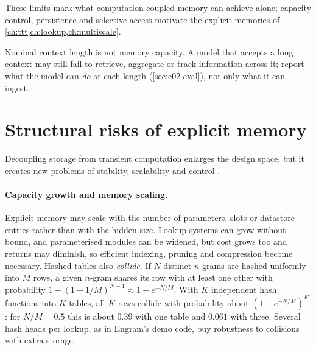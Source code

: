 These limits mark what computation-coupled memory can achieve alone; capacity control, persistence
and selective access motivate the explicit memories of \cref{ch:ttt,ch:lookup,ch:multiscale}.

\begin{pitfall}
Nominal context length is not memory capacity. A model that accepts a long context may still fail
to retrieve, aggregate or track information across it; report what the model can \emph{do} at each
length (\cref{sec:c02-eval}), not only what it can ingest.
\end{pitfall}

\section{Structural risks of explicit memory}\label{sec:c02-explicit-risks}

Decoupling storage from transient computation enlarges the design space, but it creates new
problems of stability, scalability and control \citep[\S IV-E]{zhoubian2026memory}.

\paragraph{Capacity growth and memory scaling.} Explicit memory may scale with the number of
parameters, slots or datastore entries rather than with the hidden size. Lookup systems can grow
without bound, and parameterised modules can be widened, but cost grows too and returns may
diminish, so efficient indexing, pruning and compression become necessary. Hashed tables also
\emph{collide}. If $N$ distinct $n$-grams are hashed uniformly into $M$ rows, a given $n$-gram
shares its row with at least one other with probability $1 - (1 - 1/M)^{N-1} \approx 1 - e^{-N/M}$.
With $K$ independent hash functions into $K$ tables, all $K$ rows collide with probability about
$(1 - e^{-N/M})^K$: for $N/M = 0.5$ this is about $0.39$ with one table and $0.061$ with three.
Several hash heads per lookup, as in Engram's demo code, buy robustness to collisions with extra
storage.


